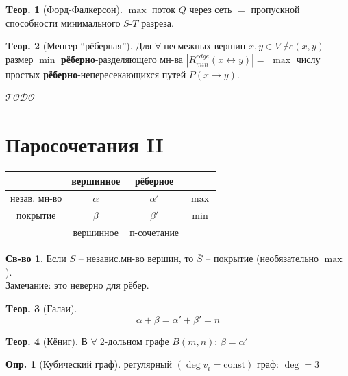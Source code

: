 \documentclass[a4paper,12pt]{article}
\theoremstyle{definition}
\newtheorem{definition}{Опр.}[section]
\newtheorem*{property}{Св-во}  %
\theoremstyle{definition}
\newtheorem{theorem}{Tеор.}[section]
\def\iiany{$\forall\;$}
\def\iiTODO{\guillemotleft$\mathcal{TODO}$\guillemotright\textellipsis}
\begin{document}
\begin{theorem}[Форд-Фалкерсон]
	$\max$ поток $Q$ через сеть $=$ пропускной способности минимального $S$-$T$ разреза.
\end{theorem}

\begin{theorem}[Менгер ``рёберная'']
	Для \iiany несмежных вершин $x,y \in V$ $\nexists e(x,y)$ размер $\min$ \textbf{рёберно}-разделяющего мн-ва $|R^{edge}_{min}(x \leftrightarrow y)|=$ $\max$ числу простых \textbf{рёберно}-непересекающихся путей $P(x \rightarrow y)$.
\end{theorem}

\iiTODO



\section{Паросочетания II}

\begin{center}
  \begin{tabular}{|c|c|c|c|}
	\cline{2-3}
	\multicolumn{1}{c|}{} & вершинное & рёберное     & \multicolumn{1}{|c}{} \\ \hline
	незав. мн-во          & $\alpha$  & $\alpha'$    & $\max$                \\ \hline
	покрытие              & $\beta$   & $\beta'$     & $\min$                \\ \hline
	\multicolumn{1}{c|}{} & вершинное & п-сочетание  & \multicolumn{1}{|c}{} \\ \cline{2-3}
  \end{tabular}
\end{center}

\begin{property}
	Если $S$ -- независ.мн-во вершин, то $\bar{S}$ -- покрытие (необязательно $\max$).\\
	Замечание: это неверно для рёбер.
\end{property}

\begin{theorem}[Галаи]
	\[ \alpha + \beta = \alpha' + \beta' = n \]
\end{theorem}

\begin{theorem}[Кёниг]
	В \iiany 2-дольном графе $B(m,n)$: $\beta = \alpha'$
\end{theorem}

\begin{definition}[Кубический граф]
	регулярный $(\deg v_i = \mathrm{const})$ граф: $\deg = 3$
\end{definition}
\end{document}
